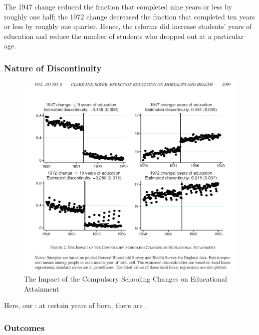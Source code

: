             The 1947 change reduced the fraction that completed nine years or less by roughly one half; the 1972 change decreased the fraction that completed ten years or less by roughly one quarter. Hence, the reforms did increase students' years of education and reduce the number of students who dropped out at a particular age.

        \subsubsection{Nature of Discontinuity}
            \begin{figure}[H]
                \centering
                \includegraphics[width=5in]{images/ch3/36.png}
                \caption{The Impact of the Compulsory Schooling Changes on Educational Attainment}
            \end{figure}
            
            Here, our : at certain years of born, there are .
    

        \subsubsection{Outcomes}

